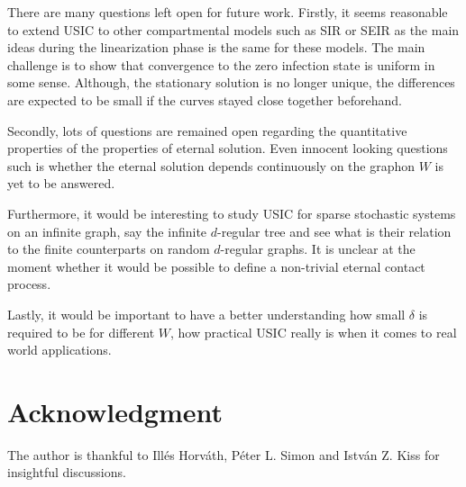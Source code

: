 \documentclass{article}
\newcommand{\1}[1]{{\mathds{1}}_{\left\{#1\right\}}}
\newcommand{\rem}[1]{{#1}}
\begin{document}
\rem{There are many questions left open for future work. Firstly, it seems reasonable to extend USIC to other compartmental models such as SIR or SEIR as the main ideas during the linearization phase is the same for these models. The main challenge is to show that convergence to the zero infection state is uniform in some sense. Although, the stationary solution is no longer unique, the differences are expected to be small if the curves stayed close together beforehand.

Secondly, lots of questions are remained open regarding the quantitative properties of the properties of eternal solution. Even innocent looking questions such is whether the eternal solution depends continuously on the graphon $W$ is yet to be answered.

Furthermore, it would be interesting to study USIC for sparse stochastic systems on an infinite graph, say the infinite $d$-regular tree and see what is their relation to the finite counterparts on random $d$-regular graphs. It is unclear at the moment whether it would be possible to define a non-trivial eternal contact process.

Lastly, it would be important to have a better understanding how small $\delta$ is required to be for different $W$, how practical USIC really is when it comes to real world applications.
}

\section*{Acknowledgment}
The author is thankful to Ill\'es Horv\'ath, P\'eter L. Simon and Istv\'an Z. Kiss for insightful discussions.


\label{s:outlook}







		
\end{document}
